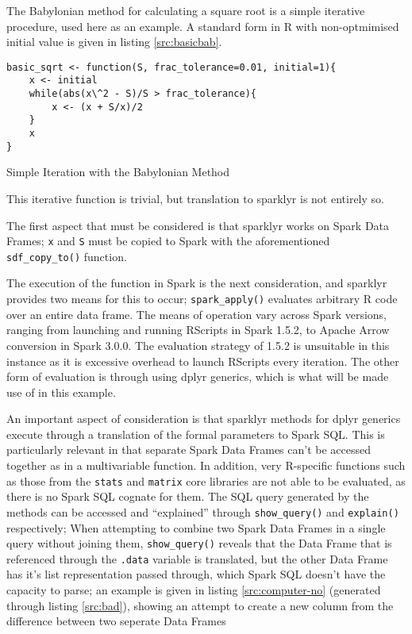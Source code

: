 \documentclass[a4paper,10pt]{article}
\begin{document}
The Babylonian method for calculating a square root is a simple iterative
procedure, used here as an example.
A standard form in R with non-optmimised initial value is given in listing
\ref{src:basicbab}.

\begin{listing}
\begin{verbatim}
basic_sqrt <- function(S, frac_tolerance=0.01, initial=1){
	x <- initial
	while(abs(x\^2 - S)/S > frac_tolerance){
		x <- (x + S/x)/2
	}
	x
}
\end{verbatim}
\caption{Simple Iteration with the Babylonian Method}\label{src:basicbab}
\end{listing}

This iterative function is trivial, but translation to sparklyr is not entirely so.

The first aspect that must be considered is that sparklyr works on Spark Data
Frames;
\texttt{x} and \texttt{S} must be copied to Spark with the aforementioned
\texttt{sdf\_copy\_to()} function.

The execution of the function in Spark is the next consideration, and sparklyr
provides two means for this to occur;
\texttt{spark\_apply()} evaluates arbitrary R code over an entire data frame.
The means of operation vary across Spark versions, ranging from launching and
running RScripts in Spark 1.5.2, to Apache Arrow conversion in Spark 3.0.0. 
The evaluation strategy of 1.5.2 is unsuitable in this instance as it is
excessive overhead to launch RScripts every iteration. 
The other form of evaluation is through using dplyr generics, which is what
will be made use of in this example.

An important aspect of consideration is that sparklyr methods for dplyr
generics execute through a translation of the formal parameters to Spark SQL.
This is particularly relevant in that separate Spark Data Frames can't be
accessed together as in a multivariable function.
In addition, very R-specific functions such as those from the \texttt{stats}
and \texttt{matrix} core libraries are not able to be evaluated, as there is no
Spark SQL cognate for them.
The SQL query generated by the methods can be accessed and ``explained''
through \texttt{show\_query()} and \texttt{explain()} respectively;
When attempting to combine two Spark Data Frames in a single query without 
joining them, \texttt{show\_query()} reveals that the Data Frame that is
referenced through the \texttt{.data} variable is translated, but the other
Data Frame has it's list representation passed through, which Spark SQL doesn't
have the capacity to parse; 
an example is given in listing \ref{src:computer-no} (generated through listing
\ref{src:bad}), showing an attempt to create a new column from the difference
between two seperate Data Frames
\end{document}
